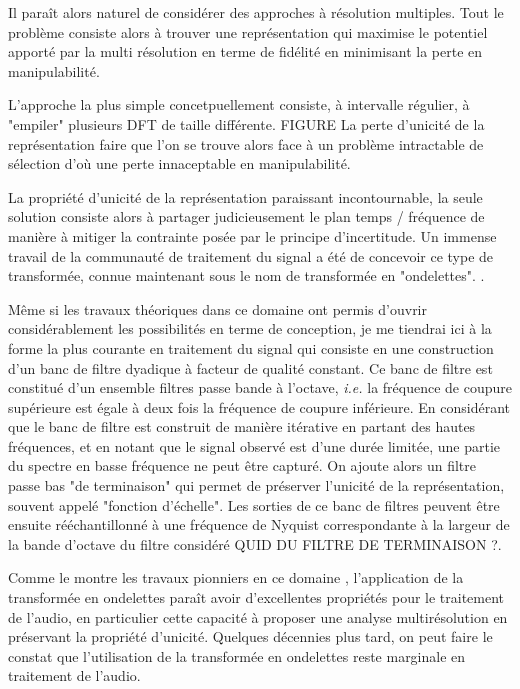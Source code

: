 Il paraît alors naturel de considérer des approches à résolution multiples. Tout le problème consiste alors à trouver une représentation qui maximise le potentiel apporté par la multi résolution en terme de fidélité en minimisant la perte en manipulabilité.

L'approche la plus simple concetpuellement consiste, à intervalle régulier, à "empiler" plusieurs DFT de taille différente. FIGURE
La perte d'unicité de la représentation faire que l'on se trouve alors face à un problème intractable de sélection d'où une perte innaceptable en manipulabilité.

La propriété d'unicité de la représentation paraissant incontournable, la seule solution consiste alors à partager judicieusement le plan temps / fréquence de manière à mitiger la contrainte posée par le principe d'incertitude. Un immense travail de la communauté de traitement du signal a été de concevoir ce type de transformée, connue maintenant sous le nom de transformée en "ondelettes". \cite{mallat1989theory}.

Même si les travaux théoriques dans ce domaine ont permis d'ouvrir considérablement les possibilités en terme de conception, je me  tiendrai ici à la forme la plus courante en traitement du signal qui consiste en une construction d'un banc de filtre dyadique à facteur de qualité constant. Ce banc de filtre est constitué d'un ensemble filtres passe bande à l'octave, \textit{i.e.} la fréquence de coupure supérieure est égale à deux fois la fréquence de coupure inférieure. En considérant que le banc de filtre est construit de manière itérative en partant des hautes fréquences, et en notant que le signal observé est d'une durée limitée, une partie du spectre en basse fréquence ne peut être capturé. On ajoute alors un filtre passe bas "de terminaison" qui permet de préserver l'unicité de la représentation, souvent appelé "fonction d'échelle". Les sorties de ce banc de filtres peuvent être ensuite rééchantillonné à une fréquence de Nyquist correspondante à la largeur de la bande d'octave du filtre considéré QUID DU FILTRE DE TERMINAISON ?.

Comme le montre les travaux pionniers en ce domaine \cite{kronland1987analysis}, l'application de la transformée en ondelettes paraît avoir d'excellentes propriétés pour le traitement de l'audio, en particulier cette capacité à proposer une analyse multirésolution en préservant la propriété d'unicité. Quelques décennies plus tard, on peut faire le constat que l'utilisation de la transformée en ondelettes reste marginale en traitement de l'audio.

